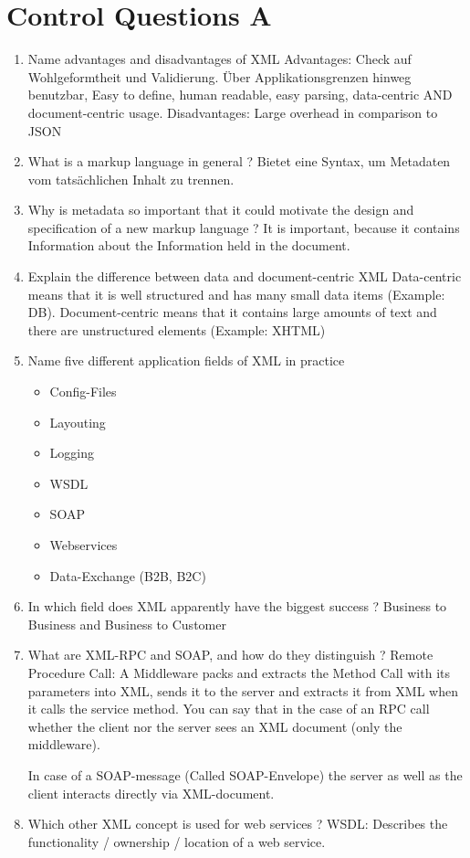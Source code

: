 \section{Control Questions A}
\begin{enumerate}
\item Name advantages and disadvantages of XML
\subitem Advantages: Check auf Wohlgeformtheit und Validierung. Über Applikationsgrenzen hinweg benutzbar, Easy to define, human readable, easy parsing, data-centric AND document-centric usage. Disadvantages: Large overhead in comparison to JSON
\item What is a markup language in general ?
\subitem Bietet eine Syntax, um Metadaten vom tatsächlichen Inhalt zu trennen.
\item Why is metadata so important that it could motivate the design and specification of a new markup language ?
\subitem It is important, because it contains Information about the Information held in the document.
\item Explain the difference between data and document-centric XML
\subitem Data-centric means that it is well structured and has many small data items (Example: DB). Document-centric means that it contains large amounts of text and there are unstructured elements (Example: XHTML)
\item Name five different application fields of XML in practice
\subitem \begin{itemize}
\item Config-Files
\item Layouting
\item Logging
\item WSDL
\item SOAP
\item Webservices
\item Data-Exchange (B2B, B2C)
\end{itemize}
\item In which field does XML apparently have the biggest success ?
\subitem Business to Business and Business to Customer
\item What are XML-RPC and SOAP, and how do they distinguish ?
\subitem Remote Procedure Call: A Middleware packs and extracts the Method Call with its parameters into XML, sends it to the server and extracts it from XML when it calls the service method. You can say that in the case of an RPC call whether the client nor the server sees an XML document (only the middleware).

In case of a SOAP-message (Called SOAP-Envelope) the server as well as the client interacts directly via XML-document.
\item Which other XML concept is used for web services ?
\subitem WSDL: Describes the functionality / ownership / location of a web service.
\end{enumerate}

